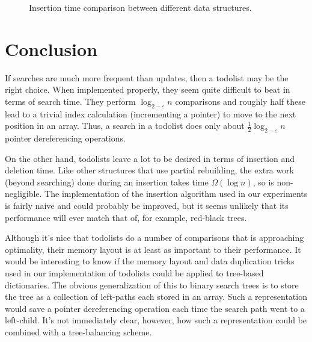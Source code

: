 \documentclass[lotsofwhite]{patmorin}
\newcommand{\eps}{\varepsilon}
\begin{document}
\begin{figure}
  \centering{}
  \caption{Insertion time comparison between different data structures.}
\end{figure}



\section{Conclusion}

If searches are much more frequent than updates, then a todolist
may be the right choice.  When implemented properly, they seem quite
difficult to beat in terms of search time.  They perform $\log_{2-\eps}
n$ comparisons and roughly half these lead to a trivial index calculation
(incrementing a pointer) to move to the next position in an array. Thus,
a search in a todolist does only about $\frac{1}{2}\log_{2-\eps} n$
pointer dereferencing operations.

On the other hand, todolists leave a lot to be desired in terms of
insertion and deletion time.  Like other structures that use partial
rebuilding, the extra work (beyond searching) done during an insertion
takes time $\Omega(\log n)$, so is non-negligible.  The implementation of the insertion algorithm used in our experiments is fairly naive and could probably be improved, but it seems unlikely that its performance will ever match that of, for example, red-black trees.

Although it's nice that todolists do a number of comparisons that is
approaching optimality, their memory layout is at least as important to
their performance.  It would be interesting to know if the memory layout
and data duplication tricks used in our implementation of todolists could
be applied to tree-based dictionaries.  The obvious generalization of this
to binary search trees is to store the tree as a collection of left-paths
each stored in an array. Such a representation would save a pointer
dereferencing operation each time the search path went to a left-child.
It's not immediately clear, however, how such a representation could be
combined with a tree-balancing scheme.
\end{document}
